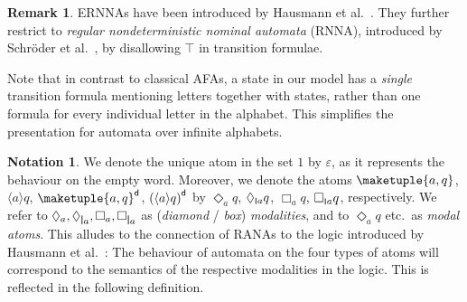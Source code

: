 \documentclass[10pt,a4paper]{amsart}
\theoremstyle{definition}
\newtheorem{rem}[theo]{Remark}
\newtheorem{notation}[theo]{Notation}
\renewcommand{\textsf}[1]{{\oldtextsf{\small#1}}}
\newcommand{\muBar}{\mbox{\textsf{Bar-$\mu$TL}}\xspace}
\newcommand{\dual}[1]{{#1}^\mathsf{d}}
\renewcommand{\epsilon}{\varepsilon}
\newcommand{\braket}[1]{\langle #1 \rangle}
\newcommand{\midmid}{\hspace{0.2ex}{\rule[-0.1ex]{0.6pt}{1.65ex}}\hspace{0.2ex}}
\newcommand{\scriptmidmid}{\hspace{0.2ex}{\rule[-0.1ex]{0.6pt}{1.1ex}}\hspace{0.2ex}}
\newcommand{\newletter}[1]{{\midmid}#1}
\newcommand{\scriptnew}[1]{{\scriptmidmid}#1}
\let\originalleft\left
\let\originalright\right
\renewcommand{\left}{\mathopen{}\mathclose\bgroup\originalleft}
\renewcommand{\right}{\aftergroup\egroup\originalright}
\begin{document}
\begin{rem} \label{rem:equivRNNA}
  ERNNAs have been introduced by Hausmann et al.~\cite{hms21}. They further restrict to \emph{regular nondeterministic nominal automata} (RNNA), introduced by Schröder et al.~\cite{skmw17}, by disallowing $\top$ in transition formulae.
\end{rem}

\noindent Note that in contrast to classical AFAs, a state in our
model has a \emph{single} transition formula mentioning letters
together with states, rather than one formula for every individual
letter in the alphabet. This simplifies the presentation for automata
over infinite alphabets.


\begin{notation}
  We denote the unique atom in the set $1$ by $\epsilon$, as it
  represents the behaviour on the empty word. Moreover, we denote the
  atoms $\maketuple{a,q}$, $\braket{a}q$, $\dual{\maketuple{a,q}}$,
  $\dual{\left(\braket{a}q\right)}$ by $\Diamond_a q$,
  $\Diamond_{\scriptnew{a}} q$, $\Box_a q$, $\Box_{\scriptnew{a}} q$,
  respectively.  We refer to $\Diamond_a,\Diamond_{\newletter
    a},\Box_a,\Box_{\newletter a}$ as
  (\emph{diamond} / \emph{box}) \emph{modalities}, and to $\Diamond_a q$
  etc.\ as \emph{modal atoms}.  This alludes to the connection
  of RANAs to the logic \muBar introduced by Hausmann et
  al.~\cite{hms21}: The behaviour of automata on the four types of
  atoms will correspond to the semantics of the respective modalities
  in the logic. This is reflected in the following definition.
\end{notation}
\end{document}
